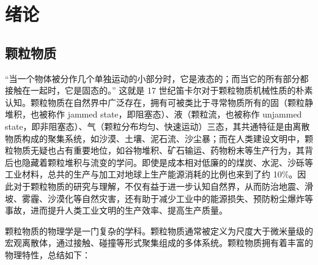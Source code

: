 
\chapter{绪论}

\section{颗粒物质}

“当一个物体被分作几个单独运动的小部分时，它是液态的；而当它的所有部分都接触在一起时，它是固态的。” 这就是 17 世纪笛卡尔对于颗粒物质机械性质的朴素认知。颗粒物质在自然界中广泛存在，拥有可被类比于寻常物质所有的固（颗粒静堆积，也被称作 jammed state，即阻塞态）、液（颗粒流，也被称作 unjammed state，即非阻塞态）、气（颗粒分布均匀、快速运动）三态\cite{RevModPhys.68.1259}，其共通特征是由离散物质构成的聚集系统，如沙漠、土壤、泥石流、沙尘暴；而在人类建设文明中，颗粒物质无疑也占有重要地位，如谷物堆积、矿石输运、药物粉末等生产行为，其背后也隐藏着颗粒堆积与流变的学问。即使是成本相对低廉的的煤炭、水泥、沙砾等工业材料，总共的生产与加工对地球上生产能源消耗的比例也来到了约 \num{10}\%\cite{duran2000sands}。因此对于颗粒物质的研究与理解，不仅有益于进一步认知自然界，从而防治地震、滑坡、雾霾、沙漠化等自然灾害，还有助于减少工业中的能源损失、预防粉尘爆炸等事故，进而提升人类工业文明的生产效率、提高生产质量。

颗粒物质的物理学是一门复杂的学科。颗粒物质通常被定义为尺度大于微米量级的宏观离散体，通过接触、碰撞等形式聚集组成的多体系统。颗粒物质拥有着丰富的物理特性，总结如下：

